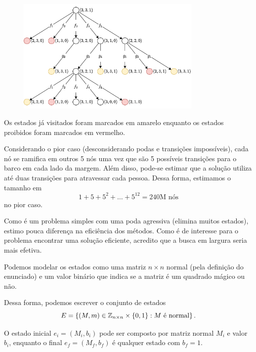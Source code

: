 \documentclass[a4paper]{report}
\begin{document}

\begin{figure}[H]
    \centering
    \includegraphics[width=0.8\textwidth]{figures/lista1_3_d.png}
\end{figure}

Os estados já visitados foram marcados em amarelo enquanto os estados proibidos foram marcados em vermelho.


Considerando o pior caso (desconsiderando podas e transições impossíveis), cada nó se ramifica em outros 5 nós uma vez que são 5 possíveis transições para o barco em cada lado da margem. Além disso, pode-se estimar que a solução utiliza até duas transições para atravessar cada pessoa. Dessa forma, estimamos o tamanho em \[
1 + 5 + 5^2 + \ldots + 5^{12} = 240\text{M nós}
\] no pior caso.


Como é um problema simples com uma poda agressiva (elimina muitos estados), estimo pouca diferença na eficiência dos métodos. Como é de interesse para o problema encontrar uma solução eficiente, acredito que a busca em largura seria mais efetiva.



Podemos modelar os estados como uma matriz $n\times n$ normal (pela definição do enunciado) e um valor binário que indica se a matriz é um quadrado mágico ou não.

Dessa forma, podemos escrever o conjunto de estados \[
E = \left\{ \left( M, m \right) \in  \mathbb{Z}_{n\times n} \times \{0,1\} : M\text{ é normal} \right\} 
.\] 


O estado inicial $e_i=\left( M_i, b_i \right) $ pode ser composto por matriz normal $M_i$ e valor $b_i$, enquanto o final $e_f=\left( M_f,b_f \right) $ é qualquer estado com $b_f=1$.
\end{document}
